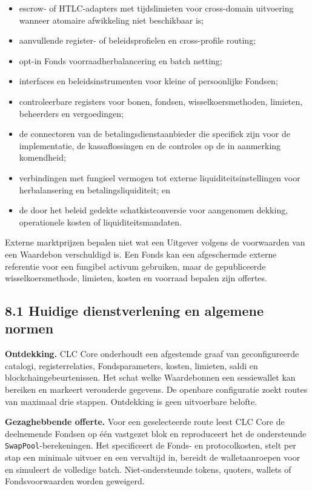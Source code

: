 \documentclass[11pt]{article}
\begin{document}
\begin{itemize}[leftmargin=*]
\item escrow- of HTLC-adapters met tijdslimieten voor cross-domain uitvoering wanneer atomaire afwikkeling niet beschikbaar is;
\item aanvullende register- of beleidsprofielen en cross-profile routing;
\item opt-in Fonds voorraadherbalancering en batch netting;
\item interfaces en beleidsinstrumenten voor kleine of persoonlijke Fondsen;
\item controleerbare registers voor bonen, fondsen, wisselkoersmethoden, limieten, beheerders en vergoedingen;
\item de connectoren van de betalingsdienstaanbieder die specifiek zijn voor de implementatie, de kassaflossingen en de controles op de in aanmerking komendheid;
\item verbindingen met fungieel vermogen tot externe liquiditeitsinstellingen voor herbalansering en betalingsliquiditeit; en
\item de door het beleid gedekte schatkistconversie voor aangenomen dekking, operationele kosten of liquiditeitsmandaten.
\end{itemize}
Externe marktprijzen bepalen niet wat een Uitgever volgens de voorwaarden van een Waardebon verschuldigd is. Een Fonds kan een afgeschermde externe referentie voor een fungibel activum gebruiken, maar de gepubliceerde wisselkoersmethode, limieten, kosten en voorraad bepalen zijn offertes.

\subsection*{8.1 Huidige dienstverlening en algemene normen}

\textbf{Ontdekking.} CLC Core onderhoudt een afgestemde graaf van geconfigureerde catalogi, registerrelaties, Fondsparameters, kosten, limieten, saldi en blockchaingebeurtenissen. Het schat welke Waardebonnen een sessiewallet kan bereiken en markeert verouderde gegevens. De openbare configuratie zoekt routes van maximaal drie stappen. Ontdekking is geen uitvoerbare belofte.

\textbf{Gezaghebbende offerte.} Voor een geselecteerde route leest CLC Core de deelnemende Fondsen op één vastgezet blok en reproduceert het de ondersteunde \texttt{SwapPool}-berekeningen. Het specificeert de Fonds- en protocolkosten, stelt per stap een minimale uitvoer en een vervaltijd in, bereidt de walletaanroepen voor en simuleert de volledige batch. Niet-ondersteunde tokens, quoters, wallets of Fondsvoorwaarden worden geweigerd.
\end{document}
